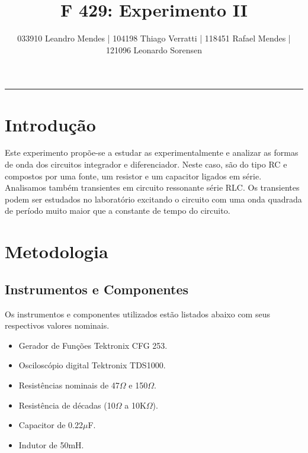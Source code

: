 \documentclass[10pt,letterpaper]{article}
\title{F 429: Experimento II}
\author{033910 Leandro Mendes | 104198 Thiago Verratti | 118451 Rafael Mendes | 121096 Leonardo Sorensen}
\makeatletter
\def\thickhrulefill{\leavevmode \leaders \hrule height 1pt\hfill \kern \z@}
\renewcommand{\maketitle}{
	\begingroup
		\parindent \z@
		\begin{center}
			{\normalsize \@author\par}%
			\thickhrulefill\par
			{\small\raggedleft \@date\par}%
			{\Large\raggedright \@title\par}%
		\end{center}%
	\endgroup
}
\makeatother
\begin{document}
\maketitle
\tableofcontents
\listoffigures
\listoftables
\newpage
\section{Introdução}
Este experimento propõe-se a estudar as experimentalmente e analizar as formas de onda dos circuitos integrador e
diferenciador. Neste caso, são do tipo RC e compostos por uma fonte, um resistor e um
capacitor ligados em série.\\
Analisamos também transientes em circuito ressonante série RLC. Os transientes podem ser estudados no laboratório excitando o circuito com uma onda quadrada de período muito maior que a constante de tempo do circuito.
\section{Metodologia}
\subsection{Instrumentos e Componentes}
Os instrumentos e componentes utilizados estão listados abaixo com seus respectivos valores nominais.
\begin{itemize}
\item{Gerador de Funções Tektronix CFG 253.} 
\item{Osciloscópio digital Tektronix TDS1000.}
\item{Resistências nominais de 47$\Omega$ e 150$\Omega$.}
\item{Resistência de décadas (10$\Omega$ a 10K$\Omega$).}
\item{Capacitor de 0.22$\mu$F.}
\item{Indutor de 50mH.}
\end{itemize}
\end{document}
